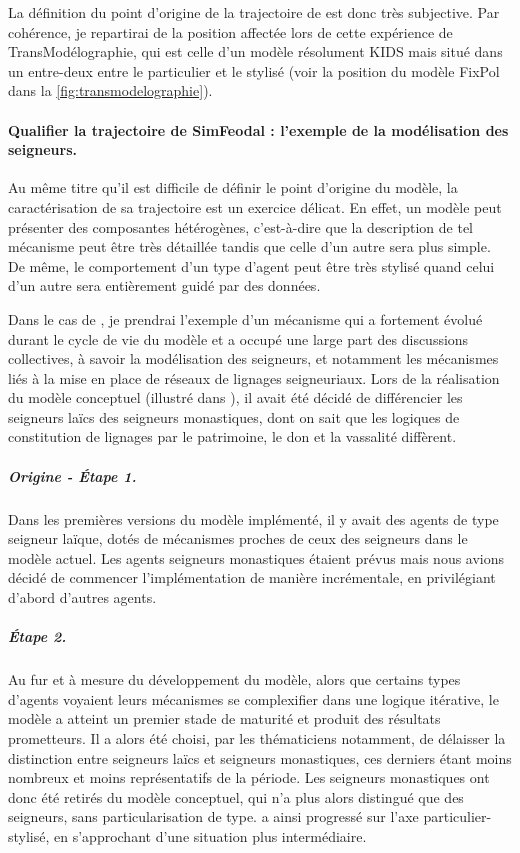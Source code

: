 La définition du point d'origine de la trajectoire de \simfeodal{} est donc très subjective.
Par cohérence, je repartirai de la position affectée lors de cette expérience de \og TransModélographie\fg{}, qui est celle d'un modèle résolument KIDS mais situé dans un entre-deux entre le particulier et le stylisé (voir la position du modèle FixPol dans la \cref{fig:transmodelographie}).


\paragraph{Qualifier la trajectoire de SimFeodal : l'exemple de la modélisation des seigneurs.}
Au même titre qu'il est difficile de définir le point d'origine du modèle, la caractérisation de sa trajectoire est un exercice délicat.
En effet, un modèle peut présenter des composantes hétérogènes, c'est-à-dire que la description de tel mécanisme peut être très détaillée tandis que celle d'un autre sera plus simple.
De même, le comportement d'un type d'agent peut être très stylisé quand celui d'un autre sera entièrement guidé par des données.

Dans le cas de \simfeodal{}, je prendrai l'exemple d'un mécanisme qui a fortement évolué durant le cycle de vie du modèle et a occupé une large part des discussions collectives, à savoir la modélisation des seigneurs, et notamment les mécanismes liés à la mise en place de réseaux de lignages seigneuriaux.
Lors de la réalisation du modèle conceptuel (illustré dans \textcite[fig. 13.1, p. 297]{tannier_ontologie_2014}), il avait été décidé de différencier les seigneurs laïcs des seigneurs monastiques, dont on sait que les logiques de constitution de lignages par le patrimoine, le don et la vassalité diffèrent.

\subparagraph{Origine - Étape 1.}
Dans les premières versions du modèle implémenté, il y avait des agents de type \og seigneur laïque\fg{}, dotés de mécanismes proches de ceux des \og seigneurs\fg{} dans le modèle actuel.
Les agents \og seigneurs monastiques\fg{} étaient prévus mais nous avions décidé de commencer l'implémentation de manière incrémentale, en privilégiant d'abord d'autres agents.

\subparagraph{Étape 2.}
Au fur et à mesure du développement du modèle, alors que certains types d'agents voyaient leurs mécanismes se complexifier dans une logique itérative, le modèle a atteint un premier stade de maturité et produit des résultats prometteurs.
Il a alors été choisi, par les thématiciens notamment, de délaisser la distinction entre seigneurs laïcs et seigneurs monastiques, ces derniers étant moins nombreux et moins représentatifs de la période.
Les seigneurs monastiques ont donc été retirés du modèle conceptuel, qui n'a plus alors distingué que des \og seigneurs\fg{}, sans particularisation de type.
\simfeodal{} a ainsi progressé sur l'axe particulier-stylisé, en s'approchant d'une situation plus intermédiaire.

